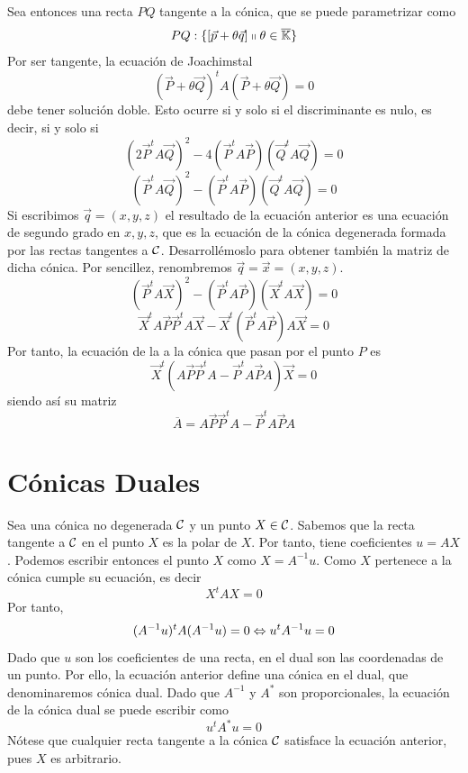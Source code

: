 Sea entonces una recta $PQ$ tangente a la cónica, que se puede parametrizar como 
\[PQ:\{\left [ \vec{p}+\theta\vec{q} \right ]\shortparallel\theta\in\overline{\mathbb{K}}\}\]
Por ser tangente, la ecuación de Joachimstal
\[(\vec{P}+\theta \vec{Q})^tA(\vec{P}+\theta \vec{Q})=0\]
debe tener solución doble. Esto ocurre si y solo si el discriminante es nulo, es decir, si y solo si
\[(2\vec{P}^tA\vec{Q})^2-4(\vec{P}^tA\vec{P})(\vec{Q}^tA\vec{Q})=0\]
\[(\vec{P}^tA\vec{Q})^2-(\vec{P}^tA\vec{P})(\vec{Q}^tA\vec{Q})=0\]
Si escribimos $\vec{q}=(x,y,z)$ el resultado de la ecuación anterior es una ecuación de segundo grado en $x,y,z$, que es la ecuación de la cónica degenerada formada por las rectas tangentes a $\mathcal{C}$. Desarrollémoslo para obtener también la matriz de dicha cónica. Por sencillez, renombremos $\vec{q}=\vec{x}=(x,y,z)$.
\[(\vec{P}^tA\vec{X})^2-(\vec{P}^tA\vec{P})(\vec{X}^tA\vec{X})=0\]
\[\vec{X}^tA\vec{P}\vec{P}^tA\vec{X}-\vec{X}^t(\vec{P}^tA\vec{P})A\vec{X}=0\]
Por tanto, la ecuación de la  a la cónica que pasan por el punto $P$ es
\begin{equation}
	\vec{X}^t(A\vec{P}\vec{P}^tA-\vec{P}^tA\vec{P}A)\vec{X}=0
\end{equation}
siendo así su matriz
\begin{equation}
\overline{A}=A\vec{P}\vec{P}^tA-\vec{P}^tA\vec{P}A
\end{equation}

\section{Cónicas Duales}
Sea una cónica no degenerada $\mathcal{C}$ y un punto $X\in \mathcal{C}$. Sabemos que la recta tangente a $\mathcal{C}$ en el punto $X$ es la polar de $X$. Por tanto, tiene coeficientes $u=AX$. Podemos escribir entonces el punto $X$ como $X=A^{-1}u$. Como $X$ pertenece a la cónica cumple su ecuación, es decir
\[X^tAX=0\]
Por tanto,
\[(A^{-1}u)^tA(A^{-1}u)=0\Leftrightarrow u^tA^{-1}u=0\]
Dado que $u$ son los coeficientes de una recta, en el dual son las coordenadas de un punto. Por ello, la ecuación anterior define una cónica en el dual, que denominaremos cónica dual. Dado que $A^{-1}$ y $A^*$ son proporcionales, la ecuación de la cónica dual se puede escribir como
\begin{equation}\label{C8_eq_conicadual}
	u^tA^*u=0
\end{equation}
Nótese que cualquier recta tangente a la cónica $\mathcal{C}$ satisface la ecuación anterior, pues $X$ es arbitrario.

